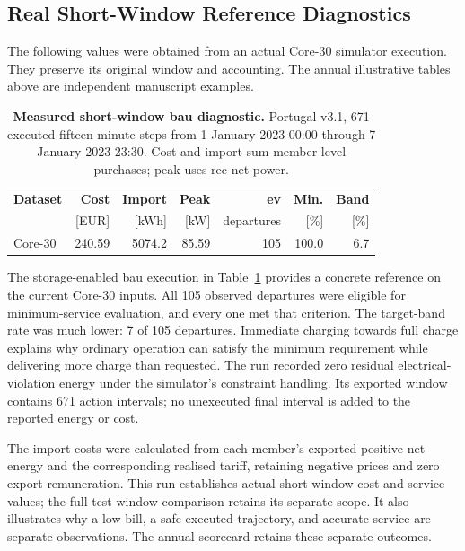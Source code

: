 \subsection{Real Short-Window Reference Diagnostics}
\label{app:reference-diagnostics}

The following values were obtained from an actual Core-30 simulator execution. They preserve its original window and accounting. The annual illustrative tables above are independent manuscript examples.

\begin{table}[H]
\centering
\caption{\textbf{Measured short-window \gls{bau} diagnostic.} Portugal v3.1, 671 executed fifteen-minute steps from 1 January 2023 00:00 through 7 January 2023 23:30. Cost and import sum member-level purchases; peak uses \gls{rec} net power.}
\label{tab:control-real-bau}
\small
\begin{tabular}{@{}lrrrrrr@{}}
\toprule
\textbf{Dataset} & \textbf{Cost} & \textbf{Import} & \textbf{Peak} & \textbf{\gls{ev}} & \textbf{Min.} & \textbf{Band}\\
 & [EUR] & [kWh] & [kW] & departures & [\%] & [\%]\\
\midrule
Core-30 & 240.59 & 5074.2 & 85.59 & 105 & 100.0 & 6.7 \\
\bottomrule
\end{tabular}
\end{table}

The storage-enabled \gls{bau} execution in Table~\ref{tab:control-real-bau} provides a concrete reference on the current Core-30 inputs. All 105 observed departures were eligible for minimum-service evaluation, and every one met that criterion. The target-band rate was much lower: 7 of 105 departures. Immediate charging towards full charge explains why ordinary operation can satisfy the minimum requirement while delivering more charge than requested. The run recorded zero residual electrical-violation energy under the simulator's constraint handling. Its exported window contains 671 action intervals; no unexecuted final interval is added to the reported energy or cost.

The import costs were calculated from each member's exported positive net energy and the corresponding realised tariff, retaining negative prices and zero export remuneration. This run establishes actual short-window cost and service values; the full test-window comparison retains its separate scope. It also illustrates why a low bill, a safe executed trajectory, and accurate service are separate observations. The annual scorecard retains these separate outcomes.


